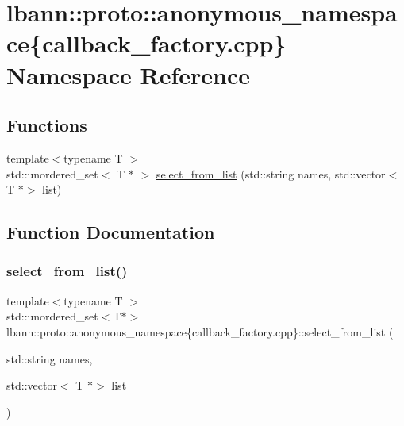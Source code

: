 \hypertarget{namespacelbann_1_1proto_1_1anonymous__namespace_02callback__factory_8cpp_03}{}\section{lbann\+:\+:proto\+:\+:anonymous\+\_\+namespace\{callback\+\_\+factory.\+cpp\} Namespace Reference}
\label{namespacelbann_1_1proto_1_1anonymous__namespace_02callback__factory_8cpp_03}
\subsection*{Functions}
\begin{DoxyCompactItemize}
\item 
{\footnotesize template$<$typename T $>$ }\\std\+::unordered\+\_\+set$<$ T $\ast$ $>$ \hyperlink{namespacelbann_1_1proto_1_1anonymous__namespace_02callback__factory_8cpp_03_ad035dbe64172ca9c5aa9c9b814966615}{select\+\_\+from\+\_\+list} (std\+::string names, std\+::vector$<$ T $\ast$$>$ list)
\end{DoxyCompactItemize}


\subsection{Function Documentation}
\mbox{\label{namespacelbann_1_1proto_1_1anonymous__namespace_02callback__factory_8cpp_03_ad035dbe64172ca9c5aa9c9b814966615}} 
\subsubsection{\texorpdfstring{select\+\_\+from\+\_\+list()}{select\_from\_list()}}
{\footnotesize\ttfamily template$<$typename T $>$ \\
std\+::unordered\+\_\+set$<$T$\ast$$>$ lbann\+::proto\+::anonymous\+\_\+namespace\{callback\+\_\+factory.\+cpp\}\+::select\+\_\+from\+\_\+list (\begin{DoxyParamCaption}\item[{std\+::string}]{names,  }\item[{std\+::vector$<$ T $\ast$$>$}]{list }\end{DoxyParamCaption})}

